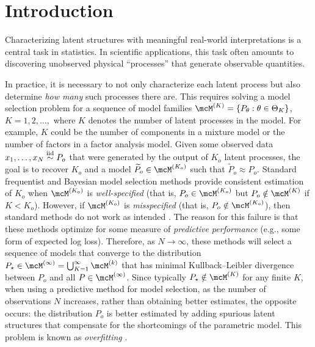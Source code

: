 \section{Introduction}
\label{sec:intro}

Characterizing latent structures with meaningful real-world interpretations is a central task in statistics.
In scientific applications, this task often amounts to discovering unobserved physical ``processes'' that generate observable quantities.

In practice, it is necessary to not only characterize each latent process but also determine \emph{how many} such processes there are.
This requires solving a model selection problem for a sequence of model families $\model{K} = \{ P_\theta : \theta \in \Theta_K\}$, $K = 1, 2, \dots,$ where $K$ denotes the number of latent processes in the model.
For example, $K$ could be the number of components in a mixture model or the number of factors in a factor analysis model.
Given some observed data $x_{1},\dots, x_{N} \stackrel{\text{iid}}{\sim} P_o$ that were generated by the output of $K_{o}$ latent processes,
the goal is to recover $K_{o}$ and a model $\widetilde{P}_o \in \model{K_{o}}$ such that $\widetilde{P}_o  \approx P_{o}$.
Standard frequentist and Bayesian model selection methods provide consistent estimation of $K_o$ when $\model{K_o}$ is \emph{well-specified} (that is, $P_o \in \model{K_o}$ but $P_o \notin \model{K}$ if $K < K_o$).
However, if $\model{K_o}$ is \emph{misspecified} (that is, $P_o \notin \model{K_o}$), then standard methods do not work as intended
\citep{Cai:2021,Guha:2021,Fruhwurth:2006,Miller:2019,Xue:2024}.
The reason for this failure is that these methods optimize for some measure of \emph{predictive performance} (e.g., some form of expected log loss).
Therefore, as $N \to \infty$, these methods will select a sequence of models that converge to the distribution $P_\star
	\in \model{\infty} = \bigcup_{K=1}^\infty \model{k}$ that has minimal Kullback--Leibler divergence between $P_o$ and all $P \in \model{\infty}$.
Since typically $P_\star \notin \model{K}$ for any finite $K$, when using a predictive method for
model selection, as the number of observations $N$ increases, rather than obtaining better estimates, the opposite occurs:
the distribution $P_o$ is better estimated by adding spurious latent structures that compensate for the shortcomings of the parametric model.
This problem is known as \emph{overfitting}  \citep{Cai:2021}. %

